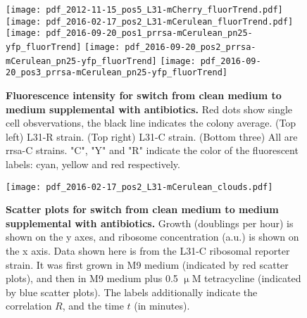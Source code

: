 
\begin{figure}
    \centering    
    \texttt{[image: pdf\_2012-11-15\_pos5\_L31-mCherry\_fluorTrend.pdf]}
    \texttt{[image: pdf\_2016-02-17\_pos2\_L31-mCerulean\_fluorTrend.pdf]} \\
    \texttt{[image: pdf\_2016-09-20\_pos1\_prrsa-mCerulean\_pn25-yfp\_fluorTrend]} %
    \texttt{[image: pdf\_2016-09-20\_pos2\_prrsa-mCerulean\_pn25-yfp\_fluorTrend]}
    \texttt{[image: pdf\_2016-09-20\_pos3\_prrsa-mCerulean\_pn25-yfp\_fluorTrend]}            
    \caption{ 
        \textbf{Fluorescence intensity for switch from clean medium to medium supplemental with antibiotics.}
        Red dots show single cell obsvervations, the black line indicates the colony average.
        (Top left) L31-R strain. 
        (Top right) L31-C strain.
        (Bottom three) All are rrsa-C strains.  
        "C", "Y" and "R" indicate the color of the fluorescent labels: cyan, yellow and red respectively.    
    }
    \label{fig:ribo:fluorsignals}
\end{figure}


\begin{figure}
    \centering    
    \texttt{[image: pdf\_2016-02-17\_pos2\_L31-mCerulean\_clouds.pdf]}
    \caption{ 
        \textbf{Scatter plots for switch from clean medium to medium supplemental with antibiotics.}
        Growth (doublings per hour) is shown on the y axes, and ribosome concentration (a.u.) is shown on the x axis.
        Data shown here is from the L31-C ribosomal reporter strain. It was first grown in M9 medium (indicated by red scatter plots), and then in M9 medium plus 0.5 $\upmu$M tetracycline (indicated by blue scatter plots).     
        The labels additionally indicate the correlation $R$, and the time $t$ (in minutes).
    }
    \label{fig:ribo:scatter1}
\end{figure}

